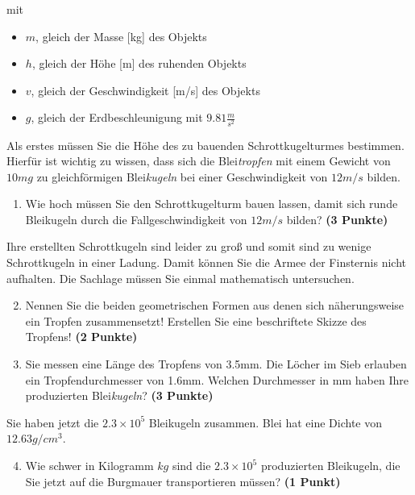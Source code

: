 \documentclass[a4paper, 9pt]{scrartcl}\usepackage[]{graphicx}\usepackage[]{xcolor}
\begin{document}
mit

\begin{itemize}[noitemsep]
\item $m$, gleich der Masse [kg] des Objekts
\item $h$, gleich der Höhe [m] des ruhenden Objekts
\item $v$, gleich der Geschwindigkeit [m/s] des Objekts
\item $g$, gleich der Erdbeschleunigung mit $9.81 \tfrac{m}{s^2}$ 
\end{itemize}

Als erstes müssen Sie die Höhe des zu bauenden Schrottkugelturmes bestimmen. Hierfür ist wichtig zu wissen, dass sich die Blei\textit{tropfen} mit einem Gewicht von $10mg$ zu gleichförmigen Blei\textit{kugeln} bei einer Geschwindigkeit von $12m/s$ bilden.

\begin{enumerate}
\item Wie hoch müssen Sie den Schrottkugelturm bauen lassen, damit sich runde Bleikugeln durch die Fallgeschwindigkeit von $12m/s$ bilden? \textbf{(3 Punkte)}
\end{enumerate}

Ihre erstellten Schrottkugeln sind leider zu gro{\ss} und somit sind zu wenige Schrottkugeln in einer Ladung. Damit können Sie die Armee der Finsternis nicht aufhalten. Die Sachlage müssen Sie einmal mathematisch untersuchen.

\begin{enumerate}
  \setcounter{enumi}{1}
\item Nennen Sie die beiden geometrischen Formen aus denen sich näherungsweise ein Tropfen zusammensetzt! Erstellen Sie eine beschriftete Skizze des Tropfens! \textbf{(2 Punkte)}
\item Sie messen eine Länge des Tropfens von 3.5mm. Die Löcher im Sieb erlauben ein Tropfendurchmesser von 1.6mm. Welchen Durchmesser in mm haben Ihre produzierten Blei\textit{kugeln}?  \textbf{(3 Punkte)}
\end{enumerate}

Sie haben jetzt die \ensuremath{2.3\times 10^{5}} Bleikugeln zusammen. Blei hat eine Dichte
von $12.63g/cm^3$.

\begin{enumerate}
  \setcounter{enumi}{3}
\item Wie schwer in Kilogramm $kg$ sind die \ensuremath{2.3\times 10^{5}} produzierten
  Bleikugeln, die Sie jetzt auf die Burgmauer transportieren müssen?
  \textbf{(1 Punkt)}
\end{enumerate}
\end{document}
